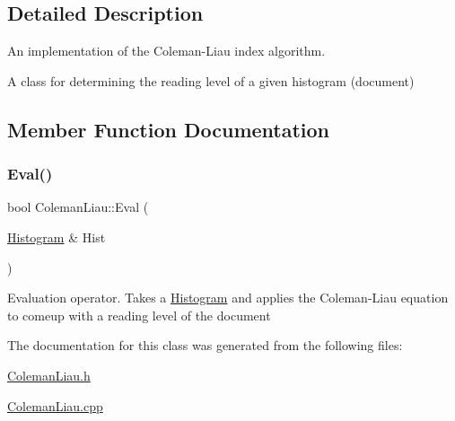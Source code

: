 \subsection{Detailed Description}
An implementation of the Coleman-\/\+Liau index algorithm. 

A class for determining the reading level of a given histogram (document) 

\subsection{Member Function Documentation}
\mbox{\label{classColemanLiau_af0b2de26e53db82cb3e7243de1f26a6f}} 
\subsubsection{\texorpdfstring{Eval()}{Eval()}}
{\footnotesize\ttfamily bool Coleman\+Liau\+::\+Eval (\begin{DoxyParamCaption}\item[{\hyperlink{classHistogram}{Histogram} \&}]{Hist }\end{DoxyParamCaption})}

Evaluation operator. Takes a \hyperlink{classHistogram}{Histogram} and applies the Coleman-\/\+Liau equation to comeup with a reading level of the document 

The documentation for this class was generated from the following files\+:\begin{DoxyCompactItemize}
\item 
\hyperlink{ColemanLiau_8h}{Coleman\+Liau.\+h}\item 
\hyperlink{ColemanLiau_8cpp}{Coleman\+Liau.\+cpp}\end{DoxyCompactItemize}
